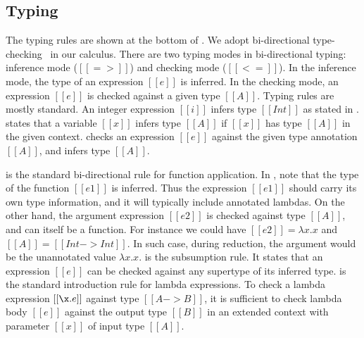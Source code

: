 \subsection{Typing}
\label{sec:union:typ}
The typing rules are shown at the bottom of .
We adopt bi-directional type-checking~\cite{pierce2000local} in our calculus.  There
are two typing modes in bi-directional typing: inference mode
($[[=>]]$) and checking mode ($[[<=]]$). In the inference mode, the type of
an expression $[[e]]$ is inferred.  In the checking
mode, an expression $[[e]]$ is checked against a given type $[[A]]$.
Typing rules are mostly standard. An integer
expression $[[i]]$ infers type $[[Int]]$ as stated in .
 states that a variable $[[x]]$ infers type $[[A]]$ if
$[[x]]$ has type $[[A]]$ in the given context. 
checks an expression $[[e]]$ against the given type annotation $[[A]]$,
and infers type $[[A]]$.

 is the standard bi-directional rule for
function application. In , note that the type of the
function $[[e1]]$ is inferred. Thus the expression $[[e1]]$ should carry
its own type information, and it will typically include annotated lambdas.
On the other hand, the argument expression $[[e2]]$ is checked against type $[[A]]$,
and can itself be a function. For instance we could have $[[e2]] = \lambda x. x$
and $[[A]] = [[Int->Int]]$. In such case, during reduction, the argument would be
the unannotated value $\lambda x. x$.
 is the subsumption rule. It states that an expression
$[[e]]$ can be checked against any supertype of its inferred type.
 is the standard introduction rule for lambda
expressions. To check a lambda expression $[[\x.e]]$ against type $[[A
    -> B]]$, it is sufficient to check lambda body $[[e]]$ against the
output type $[[B]]$ in an extended context with parameter $[[x]]$ of
input type $[[A]]$.

